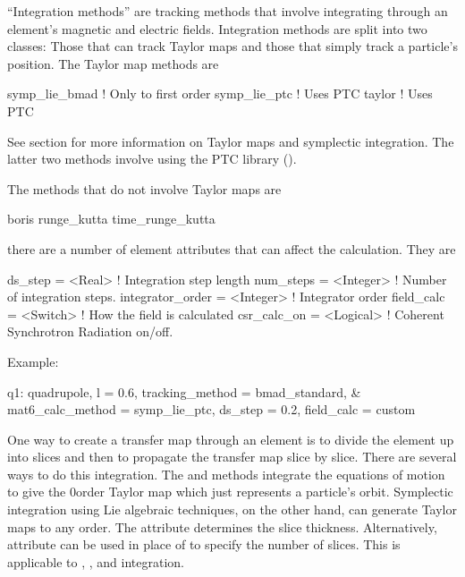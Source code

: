 ``Integration methods'' are tracking methods that involve integrating
through an element's magnetic and electric fields.  Integration
methods are split into two classes: Those that can track Taylor maps and
those that simply track a particle's position.  The Taylor map methods
are
\begin{example}
  symp_lie_bmad   ! Only to first order
  symp_lie_ptc    ! Uses PTC
  taylor          ! Uses PTC
\end{example}
See section  for more information on Taylor maps
and symplectic integration. The latter two methods involve using the
PTC library ().

The methods that do not involve Taylor maps are
\begin{example}
  boris
  runge_kutta
  time_runge_kutta
\end{example}

there are a number of element attributes that can affect the
calculation. They are
\begin{example}
  ds_step = <Real>              ! Integration step length
  num_steps = <Integer>         ! Number of integration steps.
  integrator_order = <Integer>  ! Integrator order
  field_calc = <Switch>         ! How the field is calculated
  csr_calc_on = <Logical>       ! Coherent Synchrotron Radiation on/off.
\end{example}

Example:
\begin{example}
  q1: quadrupole, l = 0.6, tracking_method = bmad_standard, &
        mat6_calc_method = symp_lie_ptc, ds_step = 0.2, field_calc = custom
\end{example}

One way to create a transfer map through an element is to divide the
element up into slices and then to propagate the transfer map slice by
slice.  There are several ways to do this integration. The 
and  methods integrate the equations of motion to
give the 0\Th order Taylor map which just represents a particle's
orbit.  Symplectic integration using Lie
algebraic techniques, on the other hand, can generate Taylor maps to
any order.  The  attribute determines the slice thickness.
Alternatively,  attribute can be used in place of
 to specify the number of slices.
This is applicable to , , and
 integration.

